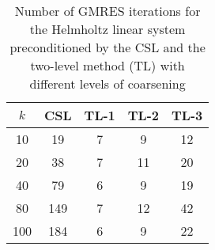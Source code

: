 \begin{table}[t]
\centering
\begin{tabular}{ccccc}
\hline
$k$ & CSL & TL-1 & TL-2 & TL-3 \\ \hline
10 & 19 & 7 & 9 & 12 \\
20 & 38 & 7 & 11 & 20 \\
40 & 79 & 6 & 9 & 19 \\
80 & 149 & 7 & 12 & 42 \\
100 & 184 & 6 & 9 & 22 \\
\hline
\end{tabular}
\caption{Number of GMRES iterations for the Helmholtz linear system preconditioned by the  CSL and the two-level method (TL) with different levels of coarsening}
\label{table:gmres_csl_vs_adef_coarse_eps_20}
\end{table}

